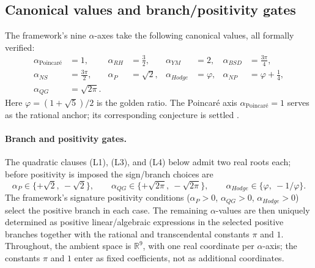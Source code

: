 \documentclass[11pt,a4paper]{amsart}
\theoremstyle{plain}
\theoremstyle{definition}
\newcommand{\Rl}{\mathbb{R}}
\newcommand{\aP}{\alpha_{P}}
\newcommand{\aNP}{\alpha_{NP}}
\newcommand{\aRH}{\alpha_{RH}}
\newcommand{\aYM}{\alpha_{YM}}
\newcommand{\aNS}{\alpha_{NS}}
\newcommand{\aBSD}{\alpha_{BSD}}
\newcommand{\aHodge}{\alpha_{Hodge}}
\newcommand{\aPoinc}{\alpha_{\text{Poincar\'e}}}
\newcommand{\aQG}{\alpha_{QG}}
\newcommand{\golden}{\varphi}
\begin{document}
\subsection{Canonical values and branch/positivity gates}
The framework's nine $\alpha$-axes take the following canonical values, all
formally verified:
\begin{equation}
\label{eq:nine-axes}
\begin{aligned}
\aPoinc &= 1, & \aRH &= \tfrac{3}{2}, & \aYM &= 2, & \aBSD &= \tfrac{3\pi}{4}, \\
\aNS &= \tfrac{3\pi}{2}, & \aP &= \sqrt{2}, & \aHodge &= \golden, & \aNP &= \golden + \tfrac{1}{4}, \\
\aQG &= \sqrt{2\pi}.
\end{aligned}
\end{equation}
Here $\golden = (1+\sqrt 5)/2$ is the golden ratio. The Poincar\'e axis
$\aPoinc = 1$ serves as the rational anchor; its corresponding conjecture
is settled \cite{perelman2003,hamilton1982,morgan2007}.

\paragraph{Branch and positivity gates.} The quadratic clauses (L1), (L3),
and (L4) below admit two real roots each; before positivity is imposed the
sign/branch choices are
\[
\aP \in \{+\sqrt 2,\ -\sqrt 2\},\qquad
\aQG \in \{+\sqrt{2\pi},\ -\sqrt{2\pi}\},\qquad
\aHodge \in \bigl\{\golden,\ -1/\golden\bigr\}.
\]
The framework's signature positivity conditions
($\aP>0$, $\aQG>0$, $\aHodge>0$) select the positive branch in each case.
The remaining $\alpha$-values are then uniquely determined as positive
linear/algebraic expressions in the selected positive branches together
with the rational and transcendental constants $\pi$ and $1$. Throughout,
the ambient space is $\Rl^{9}$, with one real coordinate per
$\alpha$-axis; the constants $\pi$ and $1$ enter as fixed coefficients,
not as additional coordinates.
\end{document}
